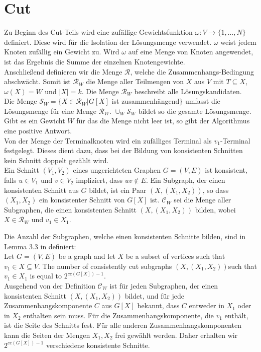 \section{Cut}
\label{sec:st_cut}
Zu Beginn des Cut-Teils wird eine zufällige Gewichtsfunktion $\omega:V\rightarrow \{1,\dots,N\}$ definiert. 
Diese wird für die Isolation der Lösungsmenge verwendet. 
$\omega$ weist jedem Knoten zufällig ein Gewicht zu. 
Wird $\omega$ auf eine Menge von Knoten angewendet, ist das Ergebnis die Summe der einzelnen Knotengewichte.\\
Anschließend definieren wir die Menge $\mathcal{R}$, welche die Zusammenhangs-Bedingung abschwächt. 
Somit ist $\mathcal{R}_W$ die Menge aller Teilmengen von $X$ aus $V$ mit $T \subseteq X$, $\omega(X)=W$ und $|X|=k$. Die Menge $\mathcal{R}_W$ beschreibt alle Lösungskandidaten.\\
Die Menge $\mathcal{S}_W=\{X \in \mathcal{R}_W | G[X]$ ist zusammenhängend$\}$ umfasst die Lösungsmenge für eine Menge $\mathcal{R}_W$. 
$\cup_W \mathcal{S}_W$ bildet so die gesamte Lösungsmenge. 
Gibt es ein Gewicht $W$ für das die Menge nicht leer ist, so gibt der Algorithmus eine positive Antwort.\\
Von der Menge der Terminalknoten wird ein zufälliges Terminal als $v_1$-Terminal festgelegt. 
Dieses dient dazu, dass bei der Bildung von konsistenten Schnitten kein Schnitt doppelt gezählt wird.\\
Ein Schnitt $(V_1,V_2)$ eines ungerichteten Graphen $G=(V,E)$ ist konsistent, falls $u \in V_1$ und $v \in V_2$ impliziert, dass $uv \notin E$. 
Ein Subgraph, der einen konsistenten Schnitt aus $G$ bildet, ist ein Paar $(X,(X_1,X_2))$, so dass $(X_1,X_2)$ ein konsistenter Schnitt von $G[X]$ ist.
$\mathcal{C}_W$ sei die Menge aller Subgraphen, die einen konsistenten Schnitt $(X,(X_1,X_2))$ bilden, wobei $X\in \mathcal{R}_W$ und $v_1 \in X_1$.

Die Anzahl der Subgraphen, welche einen konsistenten Schnitte bilden, sind in Lemma 3.3 in \cite{cygan_solving_2011} definiert:\\

Let $G=(V,E)$ be a graph and let $X$ be a subset of vertices such that $v_1 \in X \subseteq V$. The number of consistently cut subgraphs $(X,(X_1,X_2))$such that $v_1 \in X_1$ is equal to $2^{cc(G[X])-1}$.\\

Ausgehend von der Definition $\mathcal{C}_W$ ist für jeden Subgraphen, der einen konsistenten Schnitt $(X,(X_1,X_2))$ bildet, und für jede Zusammenhangskomponente $C$ aus $G[X]$ bekannt, dass  $C$ entweder in $X_1$ oder in $X_2$ enthalten sein muss. Für die Zusammenhangskomponente, die $v_1$ enthält, ist die Seite des Schnitts fest. Für alle anderen Zusammenhangskomponenten kann die Seiten der Mengen $X_1,X_2$ frei gewählt werden. Daher erhalten wir $2^{cc(G[X])-1}$ verschiedene konsistente Schnitte.

